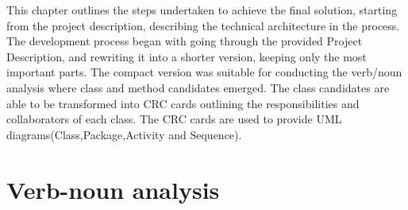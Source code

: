 \noindent 

\hspace*{1cm}This chapter outlines the steps undertaken to achieve the final solution, starting from the project description, describing the technical architecture in the process. The development process began with going through the provided Project Description, and rewriting it into a shorter version, keeping only the most important parts. The compact version was suitable for conducting the verb/noun analysis where class and method candidates emerged. The class candidates are able to be transformed into CRC cards outlining the responsibilities and collaborators of each class. The CRC cards are used to provide UML diagrams(Class,Package,Activity and Sequence).

\section{Verb-noun analysis}

